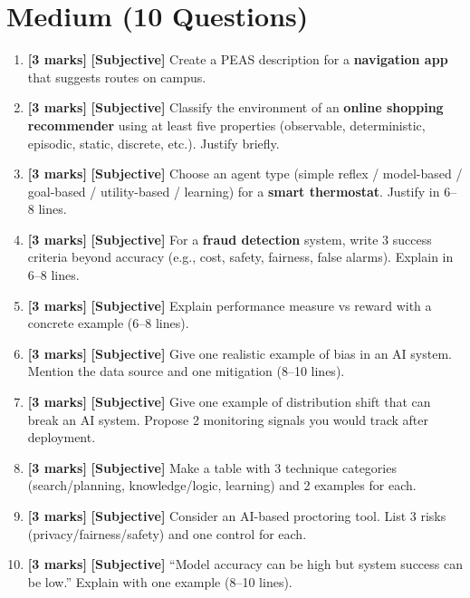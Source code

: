 \documentclass[11pt,a4paper]{article}
\newcommand{\MMarks}{\textbf{[3 marks]} }
\begin{document}
\section*{Medium (10 Questions)}
\begin{enumerate}[label=\textbf{M\arabic*.}, leftmargin=*]
  \item \MMarks \textbf{[Subjective]} Create a PEAS description for a \textbf{navigation app} that suggests routes on campus.

  \item \MMarks \textbf{[Subjective]} Classify the environment of an \textbf{online shopping recommender} using at least five properties
    (observable, deterministic, episodic, static, discrete, etc.). Justify briefly.

  \item \MMarks \textbf{[Subjective]} Choose an agent type (simple reflex / model-based / goal-based / utility-based / learning)
    for a \textbf{smart thermostat}. Justify in 6--8 lines.

  \item \MMarks \textbf{[Subjective]} For a \textbf{fraud detection} system, write 3 success criteria beyond accuracy
    (e.g., cost, safety, fairness, false alarms). Explain in 6--8 lines.

  \item \MMarks \textbf{[Subjective]} Explain performance measure vs reward with a concrete example (6--8 lines).

  \item \MMarks \textbf{[Subjective]} Give one realistic example of bias in an AI system.
    Mention the data source and one mitigation (8--10 lines).

  \item \MMarks \textbf{[Subjective]} Give one example of distribution shift that can break an AI system.
    Propose 2 monitoring signals you would track after deployment.

  \item \MMarks \textbf{[Subjective]} Make a table with 3 technique categories (search/planning, knowledge/logic, learning)
    and 2 examples for each.

  \item \MMarks \textbf{[Subjective]} Consider an AI-based proctoring tool.
    List 3 risks (privacy/fairness/safety) and one control for each.

  \item \MMarks \textbf{[Subjective]} ``Model accuracy can be high but system success can be low.'' Explain with one example (8--10 lines).
\end{enumerate}
\end{document}
